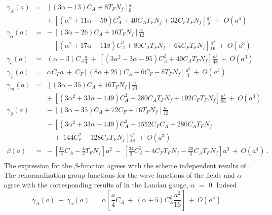 \documentclass[a4paper,11pt]{article}
\newcommand{\Nf}{N_{\!f}}
\begin{document}
\begin{eqnarray} 
\gamma_A(a) &=& \left[ ( 3\alpha - 13 ) C_A + 8T_F \Nf \right] \frac{a}{6} 
\nonumber \\
&& +~ \left[ \left( \alpha^2 + 11\alpha - 59 \right) C_A^2 + 40 C_A T_F \Nf 
+ 32 C_F T_F \Nf \right] \frac{a^2}{8} ~+~ O(a^3) \nonumber \\  
\gamma_\alpha(a) &=& -~ \left[ ( 3\alpha - 26 ) C_A + 16 T_F \Nf \right]
\frac{a}{12} \nonumber \\
&& -~ \left[ \left( \alpha^2 + 17\alpha - 118 \right) C_A^2 + 80 C_A T_F \Nf 
+ 64 C_F T_F \Nf \right] \frac{a^2}{16} ~+~ O(a^3) \nonumber \\ 
\gamma_c(a) &=& ( \alpha - 3 ) C_A \frac{a}{4} ~+~ \left[ \left( 3\alpha^2 
- 3\alpha - 95 \right) C_A^2 + 40 C_A T_F \Nf \right] \frac{a^2}{48} ~+~ O(a^3) 
\nonumber \\  
\gamma_\psi(a) &=& \alpha C_F a ~+~ C_F \left[ (8\alpha + 25)C_A - 6 C_F 
- 8 T_F \Nf \right] \frac{a^2}{4} ~+~ O(a^3) \nonumber \\  
\gamma_m(a) &=& \left[ ( 3\alpha - 35 ) C_A + 16 T_F \Nf \right] \frac{a}{24} 
\nonumber \\
&& +~ \left[ \left( 3\alpha^2 + 33\alpha - 449 \right) C_A^2 + 280 C_A T_F \Nf 
+ 192 C_F T_F \Nf \right] \frac{a^2}{96} ~+~ O(a^3) \nonumber \\
\gamma_\beta(a) &=& -~ \left[ ( 3\alpha - 35 ) C_A + 72 C_F + 16 T_F \Nf 
\right] \frac{a}{12} \nonumber \\
&& -~ \left[ \left( 3\alpha^2 + 33\alpha - 449 \right) C_A^2 + 1552 C_F C_A 
+ 280 C_A T_F \Nf \right. \nonumber \\
&& \left. ~~~~+~ 144 C_F^2 - 128 C_F T_F \Nf \right] \frac{a^2}{48} ~+~ 
O(a^3) \nonumber \\
\beta(a) &=& -~ \left[ \frac{11}{3} C_A - \frac{4}{3} T_F \Nf \right] a^2 ~-~ 
\left[ \frac{34}{3} C_A^2 - 4 C_F T_F \Nf - \frac{20}{3} C_A T_F \Nf \right]
a^3 ~+~ O(a^4) ~. \nonumber \\  
\end{eqnarray} 
The expression for the $\beta$-function agrees with the scheme independent 
results of \cite{26,27}. The renormalization group functions for the wave 
functions of the fields and $\alpha$ agree with the corresponding results of 
\cite{25,26,27,28} in the Landau gauge, $\alpha$ $=$ $0$. Indeed  
\begin{equation} 
\gamma_A(a) ~+~ \gamma_\alpha(a) ~=~ \alpha \left[ \frac{a}{4} C_A ~+~ 
\left( \alpha + 5 \right) C_A^2 \frac{a^2}{16} \right] ~+~ O(a^3) ~.  
\label{gamgam} 
\end{equation} 
\end{document}
